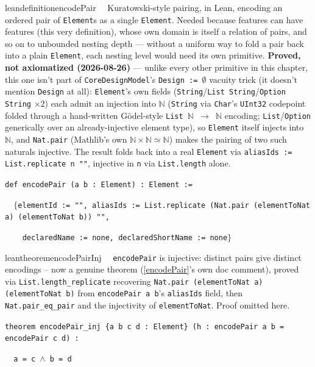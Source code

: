 \begin{restatable}{leandefinition}{encodePair}~~ Kuratowski-style pairing, in Lean, encoding
an ordered pair of \texttt{Element}s as a single \texttt{Element}. Needed because features can have features
(this very definition), whose own domain is itself a relation of pairs, and so on to unbounded nesting
depth --- without a uniform way to fold a pair back into a plain \texttt{Element}, each nesting level would
need its own primitive. \textbf{Proved, not axiomatized (2026-08-26)} --- unlike every other primitive in
this chapter, this one isn't part of \texttt{CoreDesignModel}'s \texttt{Design := $\emptyset$} vacuity trick
(it doesn't mention \texttt{Design} at all): \texttt{Element}'s own fields (\texttt{String}/\texttt{List
String}/\texttt{Option String} $\times 2$) each admit an injection into $\mathbb{N}$ (\texttt{String} via
\texttt{Char}'s \texttt{UInt32} codepoint folded through a hand-written Gödel-style \texttt{List $\mathbb{N}$
$\to$ $\mathbb{N}$} encoding; \texttt{List}/\texttt{Option} generically over an already-injective element
type), so \texttt{Element} itself injects into $\mathbb{N}$, and \texttt{Nat.pair} (Mathlib's own
$\mathbb{N} \times \mathbb{N} \simeq \mathbb{N}$) makes the pairing of two such naturals injective. The
result folds back into a real \texttt{Element} via \texttt{aliasIds := List.replicate n ""}, injective in
\texttt{n} via \texttt{List.length} alone.

\texttt{\textcolor{leancolor}{def} \textcolor{leanyellow}{encodePair} (a b : Element) : Element :=}

\texttt{~~$\{$elementId := "", aliasIds := List.replicate (Nat.pair (elementToNat a) (elementToNat b)) "",}

\texttt{~~~~declaredName := none, declaredShortName := none$\}$}
\label{encodePair}
\end{restatable}

\begin{restatable}{leantheorem}{encodePairInj}~~ \texttt{encodePair} is injective:
distinct pairs give distinct encodings -- now a genuine theorem (\ref{encodePair}'s own doc comment), proved
via \texttt{List.length\_replicate} recovering \texttt{Nat.pair (elementToNat a) (elementToNat b)} from
\texttt{encodePair a b}'s \texttt{aliasIds} field, then \texttt{Nat.pair\_eq\_pair} and the injectivity of
\texttt{elementToNat}. Proof omitted here.

\texttt{\textcolor{leancolor}{theorem} \textcolor{leanyellow}{encodePair\_inj} \{a b c d : Element\} (h : encodePair a b = encodePair c d) :}

\texttt{~~a = c $\wedge$ b = d}
\label{encodePair_inj}
\end{restatable}

